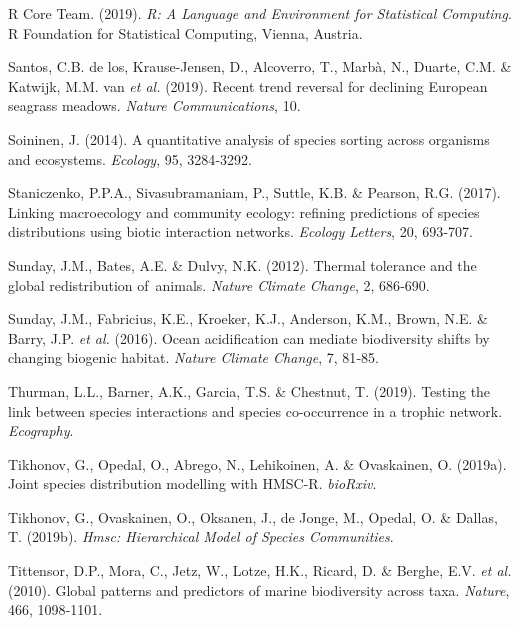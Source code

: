 \documentclass[12pt,]{article}
\newlength{\cslhangindent}
\newenvironment{cslreferences}%
  {\setlength{\parindent}{0pt}%
  \everypar{\setlength{\hangindent}{\cslhangindent}}\ignorespaces}%
  {\par}
\begin{document}
\begin{cslreferences}
\leavevmode\hypertarget{ref-RCoreTeam_2019}{}%
R Core Team. (2019). \emph{R: A Language and Environment for Statistical
Computing}. R Foundation for Statistical Computing, Vienna, Austria.

\leavevmode\hypertarget{ref-de_los_Santos_2019}{}%
Santos, C.B. de los, Krause-Jensen, D., Alcoverro, T., Marbà, N.,
Duarte, C.M. \& Katwijk, M.M. van \emph{et al.} (2019). Recent trend
reversal for declining European seagrass meadows. \emph{Nature
Communications}, 10.

\leavevmode\hypertarget{ref-Soininen_2014}{}%
Soininen, J. (2014). A quantitative analysis of species sorting across
organisms and ecosystems. \emph{Ecology}, 95, 3284‑3292.

\leavevmode\hypertarget{ref-Staniczenko_2017}{}%
Staniczenko, P.P.A., Sivasubramaniam, P., Suttle, K.B. \& Pearson, R.G.
(2017). Linking macroecology and community ecology: refining predictions
of species distributions using biotic interaction networks.
\emph{Ecology Letters}, 20, 693‑707.

\leavevmode\hypertarget{ref-Sunday_2012}{}%
Sunday, J.M., Bates, A.E. \& Dulvy, N.K. (2012). Thermal tolerance and
the global redistribution of~animals. \emph{Nature Climate Change}, 2,
686‑690.

\leavevmode\hypertarget{ref-Sunday_2016}{}%
Sunday, J.M., Fabricius, K.E., Kroeker, K.J., Anderson, K.M., Brown,
N.E. \& Barry, J.P. \emph{et al.} (2016). Ocean acidification can
mediate biodiversity shifts by changing biogenic habitat. \emph{Nature
Climate Change}, 7, 81‑85.

\leavevmode\hypertarget{ref-Thurman_2019}{}%
Thurman, L.L., Barner, A.K., Garcia, T.S. \& Chestnut, T. (2019).
Testing the link between species interactions and species co-occurrence
in a trophic network. \emph{Ecography}.

\leavevmode\hypertarget{ref-Tikhonov_2019b}{}%
Tikhonov, G., Opedal, O., Abrego, N., Lehikoinen, A. \& Ovaskainen, O.
(2019a). Joint species distribution modelling with HMSC-R.
\emph{bioRxiv}.

\leavevmode\hypertarget{ref-Hmsc_2019}{}%
Tikhonov, G., Ovaskainen, O., Oksanen, J., de Jonge, M., Opedal, O. \&
Dallas, T. (2019b). \emph{Hmsc: Hierarchical Model of Species
Communities}.

\leavevmode\hypertarget{ref-Tittensor_2010}{}%
Tittensor, D.P., Mora, C., Jetz, W., Lotze, H.K., Ricard, D. \& Berghe,
E.V. \emph{et al.} (2010). Global patterns and predictors of marine
biodiversity across taxa. \emph{Nature}, 466, 1098‑1101.


\end{cslreferences}
\end{document}

